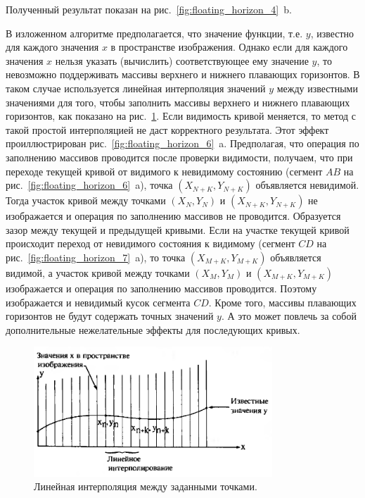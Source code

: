 Полученный результат показан на рис.~\ref{fig:floating_horizon_4}~b.

В изложенном алгоритме предполагается, что значение функции, т.е. \( y \), известно для каждого значения \( x \) в пространстве изображения. Однако если для каждого значения \( x \) нельзя указать (вычислить) соответствующее ему значение \( y \), то невозможно поддерживать массивы верхнего и нижнего плавающих горизонтов. В таком случае используется линейная интерполяция значений \( y \) между известными значениями для того, чтобы заполнить массивы верхнего и нижнего плавающих горизонтов, как показано на рис.~\ref{fig:floating_horizon_5}. Если видимость кривой меняется, то метод с такой простой интерполяцией не даст корректного результата. Этот эффект проиллюстрирован рис.~\ref{fig:floating_horizon_6}~a. Предполагая, что операция по заполнению массивов проводится после проверки видимости, получаем, что при переходе текущей кривой от видимого к невидимому состоянию (сегмент \( AB \) на рис.~\ref{fig:floating_horizon_6}~a), точка \( (X_{N+K}, Y_{N+K}) \) объявляется невидимой. Тогда участок кривой между точками \( (X_N, Y_N) \) и \( (X_{N+K}, Y_{N+K}) \) не изображается и операция по заполнению массивов не проводится. Образуется зазор между текущей и предыдущей кривыми. Если на участке текущей кривой происходит переход от невидимого состояния к видимому (сегмент \( CD \) на рис.~\ref{fig:floating_horizon_7}~a), то точка \( (X_{M+K}, Y_{M+K}) \) объявляется видимой, а участок кривой между точками \( (X_M, Y_M) \) и \( (X_{M+K}, Y_{M+K}) \) изображается и операция по заполнению массивов проводится. Поэтому изображается и невидимый кусок сегмента \( CD \). Кроме того, массивы плавающих горизонтов не будут содержать точных значений \( y \). А это может повлечь за собой дополнительные нежелательные эффекты для последующих кривых.

\begin{figure}[H]
    \centering
    \includegraphics[width=0.8\textwidth]{img/floating_horizon_5.png}
    \caption{Линейная интерполяция между заданными точками.}
    \label{fig:floating_horizon_5}
\end{figure}

